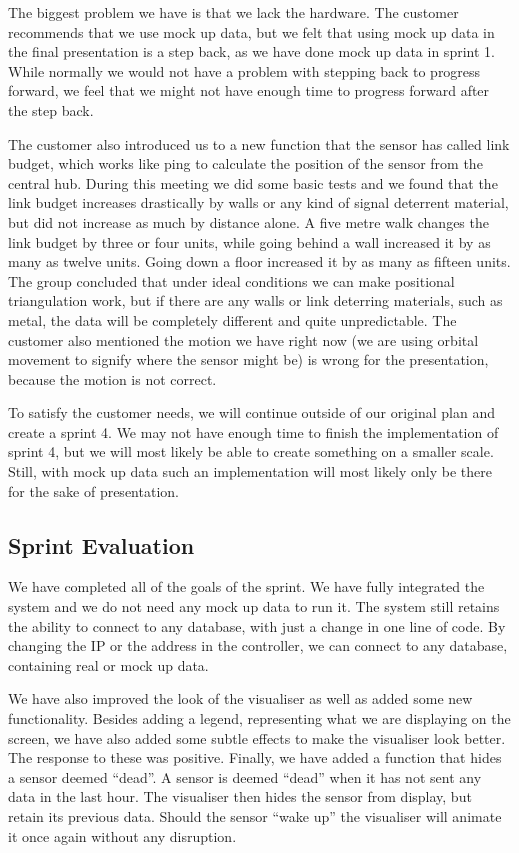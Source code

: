 \documentclass[../document]{subfiles}
\begin{document}
The biggest problem we have is that we lack the hardware. The customer recommends that we use mock up data, but we felt that using mock up data in the final presentation is a step back, as we have done mock up data in sprint 1. While normally we would not have a problem with stepping back to progress forward, we feel that we might not have enough time to progress forward after the step back.

The customer also introduced us to a new function that the sensor has called link budget, which works like ping to calculate the position of the sensor from the central hub. During this meeting we did some basic tests and we found that the link budget increases drastically by walls or any kind of signal deterrent material, but did not increase as much by distance alone. A five metre walk changes the link budget by three or four units, while going behind a wall increased it by as many as twelve units. Going down a floor increased it by as many as fifteen units. The group concluded that under ideal conditions we can make positional triangulation work, but if there are any walls or link deterring materials, such as metal, the data will be completely different and quite unpredictable. The customer also mentioned the motion we have right now (we are using orbital movement to signify where the sensor might be) is wrong for the presentation, because the motion is not correct. 

To satisfy the customer needs, we will continue outside of our original plan and create a sprint 4. We may not have enough time to finish the implementation of sprint 4, but we will most likely be able to create something on a smaller scale. Still, with mock up data such an implementation will most likely only be there for the sake of presentation.

\subsection{Sprint Evaluation}
We have completed all of the goals of the sprint. We have fully integrated the system and we do not need any mock up data to run it. The system still retains the ability to connect to any database, with just a change in one line of code. By changing the IP or the address in the controller, we can connect to any database, containing real or mock up data.

We have also improved the look of the visualiser as well as added some new functionality. Besides adding a legend, representing what we are displaying on the screen, we have also added some subtle effects to make the visualiser look better. The response to these was positive. Finally, we have added a function that hides a sensor deemed “dead”. A sensor is deemed “dead” when it has not sent any data in the last hour. The visualiser then hides the sensor from display, but retain its previous data. Should the sensor “wake up” the visualiser will animate it once again without any disruption.
\end{document}
